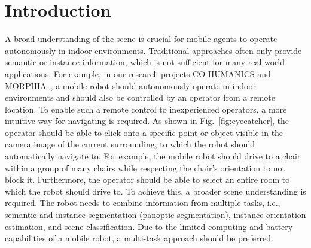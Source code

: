 \documentclass[conference]{IEEEtran}
\begin{document}
 

\section{Introduction}
\label{sec:introduction}
A broad understanding of the scene is crucial for mobile agents to operate autonomously in indoor environments.
Traditional approaches often only provide semantic or instance information, which is not sufficient for many real-world applications.
For example, in our research projects \href{http://co-humanics.de/}{CO-HUMANICS} and \href{http://morphia-projekt.de/}{MORPHIA}~\cite{morphia-isr2022}, a mobile robot should autonomously operate in indoor environments and should also be controlled by an operator from a remote location.
To enable such a remote control to inexperienced operators, a more intuitive way for navigating is required.
As shown in Fig.~\ref{fig:eyecatcher}, the operator should be able to click onto a specific point or object visible in the camera image of the current surrounding, to which the robot should automatically navigate to.
For example, the mobile robot should drive to a chair within a group of many chairs while respecting the chair's orientation to not block it. Furthermore, the operator should be able to select an entire room to which the robot should drive to.
To achieve this, a broader scene understanding is required.
The robot needs to combine information from multiple tasks, i.e., semantic and instance segmentation (panoptic segmentation), instance orientation estimation, and scene classification.
Due to the limited computing and battery capabilities of a mobile robot, a multi-task approach should be preferred.
\end{document}
